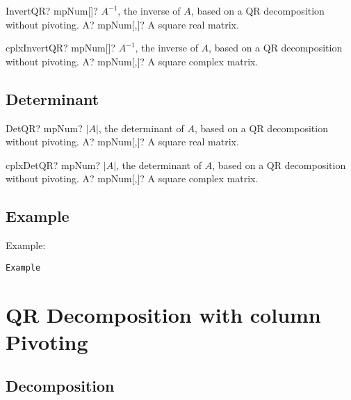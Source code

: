 \begin{mpFunctionsExtract}
	\mpFunctionOne
	{InvertQR? mpNum[]? $A^{-1}$, the inverse of $A$, based on a QR decomposition without pivoting.}
	{A? mpNum[,]? A square real matrix.}
\end{mpFunctionsExtract}

\vspace{0.6cm}
\begin{mpFunctionsExtract}
	\mpFunctionOne
	{cplxInvertQR? mpNum[]? $A^{-1}$, the inverse of $A$, based on a QR decomposition without pivoting.}
	{A? mpNum[,]? A square complex matrix.}
\end{mpFunctionsExtract}





\subsection{Determinant}

\begin{mpFunctionsExtract}
	\mpFunctionOne
	{DetQR? mpNum? $|A|$, the determinant of $A$, based on a QR decomposition without pivoting.}
	{A? mpNum[,]? A square real matrix.}
\end{mpFunctionsExtract}

\vspace{0.6cm}
\begin{mpFunctionsExtract}
	\mpFunctionOne
	{cplxDetQR? mpNum? $|A|$, the determinant of $A$, based on a QR decomposition without pivoting.}
	{A? mpNum[,]? A square complex matrix.}
\end{mpFunctionsExtract}



\subsection{Example}
Example:
\begin{verbatim}
Example
\end{verbatim}





\newpage
\section{QR Decomposition with column Pivoting}
\label{QR Decomposition with column Pivoting}

\subsection{Decomposition}


